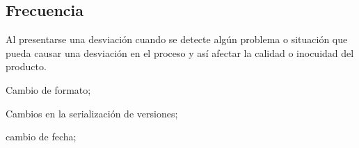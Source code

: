 \subsection{Frecuencia}
Al presentarse una desviación cuando se detecte algún problema o situación que pueda causar una desviación en el proceso y así afectar la calidad o inocuidad del producto.

\begin{changelog}[simple, sectioncmd=\subsection*,label=changelog-\thesection-\MayorVer.\MenorVer4]
	\begin{version}[v=\MayorVer.\MenorVer, date=2023--01, author=Pablo E. Alanis]
		\item Cambio de formato;
		\item Cambios en la serialización de versiones;
	\end{version}

	\begin{version}[v=1.6, date=2022--05, author=Alonso M.]
		\item cambio de fecha;
	\end{version}

\end{changelog}

